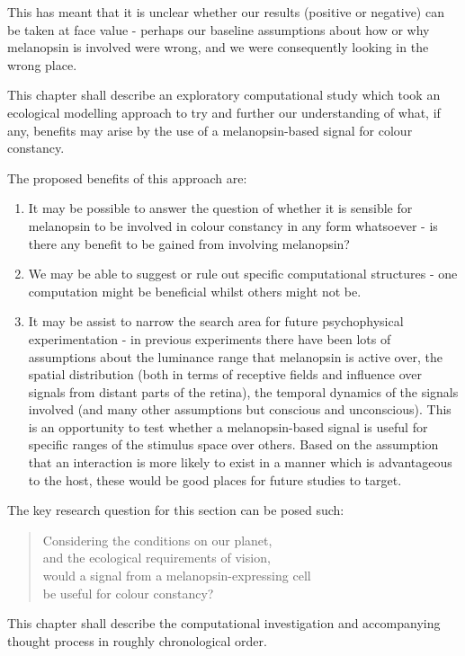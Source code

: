 This has meant that it is unclear whether our results (positive or negative) can be taken at face value - perhaps our baseline assumptions about how or why melanopsin is involved were wrong, and we were consequently looking in the wrong place.

This chapter shall describe an exploratory computational study which took an ecological modelling approach to try and further our understanding of what, if any, benefits may arise by the use of a melanopsin-based signal for colour constancy.

\noindent The proposed benefits of this approach are: 
\begin{enumerate}
    \item It may be possible to answer the question of whether it is sensible for melanopsin to be involved in colour constancy in any form whatsoever - is there any benefit to be gained from involving melanopsin?
    \item We may be able to suggest or rule out specific computational structures - one computation might be beneficial whilst others might not be.
    \item It may be assist to narrow the search area for future psychophysical experimentation - in previous experiments there have been lots of assumptions about the luminance range that melanopsin is active over, the spatial distribution (both in terms of receptive fields and influence over signals from distant parts of the retina), the temporal dynamics of the signals involved (and many other assumptions but conscious and unconscious). This is an opportunity to test whether a melanopsin-based signal is useful for specific ranges of the stimulus space over others. Based on the assumption that an interaction is more likely to exist in a manner which is advantageous to the host, these would be good places for future studies to target.
\end{enumerate}

\noindent The key research question for this section can be posed such:

\begin{quote}
\centering 
Considering the conditions on our planet, \\
and the ecological requirements of vision, \\
would a signal from a melanopsin-expressing cell \\
be useful for colour constancy?
\end{quote}

This chapter shall describe the computational investigation and accompanying thought process in roughly chronological order.

